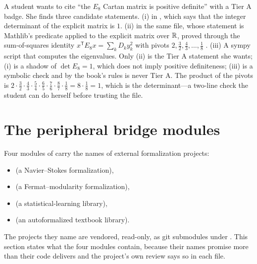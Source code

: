 \begin{example}\label{ex:architecture:depth}
A student wants to cite ``the $E_8$ Cartan matrix is positive definite'' with a Tier A
badge. She finds three candidate statements. (i)  in
, which says that the integer determinant of
the explicit matrix is $1$. (ii)  in the same file, whose statement is
Mathlib's  predicate applied to the explicit matrix over $\mathbb{R}$, proved
through the sum-of-squares identity $x^{\mathsf T}E_8x=\sum_k D_k y_k^2$ with pivots
$2,\tfrac32,\tfrac43,\ldots,\tfrac18$ .
(iii) A sympy script that computes the eigenvalues. Only (ii) is the Tier A statement she
wants; (i) is a shadow of $\det E_8=1$, which does not imply positive definiteness; (iii) is
a symbolic check and by the book's rules is never Tier A. The product of the pivots is
$2\cdot\tfrac32\cdot\tfrac43\cdot\tfrac54\cdot\tfrac65\cdot\tfrac76\cdot\tfrac87\cdot\tfrac18
= 8\cdot\tfrac18 = 1$, which is the determinant---a two-line check the student can do herself
before trusting the file.
\end{example}

\section{The peripheral bridge modules}\label{sec:architecture:bridges}

Four modules of  carry the names of external formalization
projects:
\begin{itemize}[leftmargin=*,itemsep=0pt]
\item {} (a Navier--Stokes formalization),
\item {} (a Fermat--modularity formalization),
\item {} (a statistical-learning library),
\item {} (an autoformalized textbook library).
\end{itemize}
The projects they name are vendored, read-only, as git submodules under
. This section states what the four modules contain, because their
names promise more than their code delivers and the project's own review says so in each
file.

